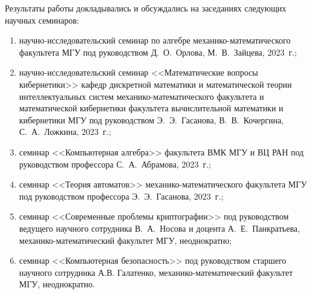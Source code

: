 Результаты работы докладывались и обсуждались на заседаниях следующих научных семинаров:
\begin{enumerate}    
    \item научно-исследовательский семинар по алгебре механико-математического факультета МГУ под руководством Д.~О.~Орлова, М.~В.~Зайцева, 2023~г.;

    \item научно-исследовательский семинар <<Математические вопросы кибернетики>> кафедр дискретной математики и математической теории интеллектуальных систем механико-математического факультета и математической кибернетики факультета вычислительной математики и кибернетики МГУ под руководством Э.~Э.~Гасанова, В.~В.~Кочергина, С.~А.~Ложкина, 2023~г.;

    \item семинар <<Компьютерная алгебра>> факультета ВМК МГУ и ВЦ РАН под руководством профессора С.~А.~Абрамова, 2023~г.;

    \item семинар <<Теория автоматов>> механико-математического факультета МГУ под руководством профессора Э.~Э.~Гасанова, 2023~г.;

    \item семинар <<Современные проблемы криптографии>> под руководством ведущего научного сотрудника В.~А.~Носова и доцента А.~Е.~Панкратьева, механико-математический факультет МГУ, неоднократно;

    \item семинар <<Компьютерная безопасность>> под руководством старшего научного сотрудника А.В. Галатенко, механико-математический факультет МГУ, неоднократно.
\end{enumerate}


